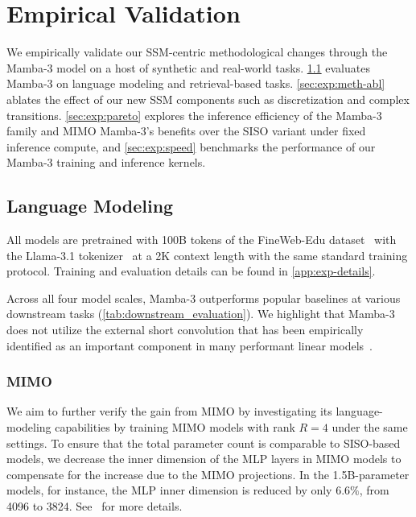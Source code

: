 


\section{Empirical Validation}
\label{sec:empirical_validation}
We empirically validate our SSM-centric methodological changes through the Mamba-3 model on a host of synthetic and real-world tasks.
\cref{sec:exp:lm} evaluates Mamba-3 on language modeling and retrieval-based tasks.
\cref{sec:exp:meth-abl} ablates the effect of our new SSM components such as discretization and complex transitions.
\cref{sec:exp:pareto} explores the inference efficiency of the Mamba-3 family and MIMO Mamba-3's benefits over the SISO variant under fixed inference compute, and \cref{sec:exp:speed} benchmarks the performance of our Mamba-3 training and inference kernels.

\subsection{Language Modeling}
\label{sec:exp:lm}

All models are pretrained with 100B tokens of the FineWeb-Edu dataset~\citep{penedo2024finewebdatasetsdecantingweb} with the Llama-3.1 tokenizer~\citep{grattafiori2024llama3herdmodels} at a 2K context length with the same standard training protocol. Training and evaluation details can be found in \cref{app:exp-details}.

Across all four model scales, Mamba-3 outperforms popular baselines at various downstream tasks (\cref{tab:downstream_evaluation}).
We highlight that Mamba-3 does not utilize the
external short convolution that has been empirically identified as an important component in many performant linear models~\citep{gu2024mambalineartimesequencemodeling,yang2025gateddeltanetworksimproving,allen2025canon}.

\subsubsection{MIMO}
We aim to further verify the gain from MIMO by investigating its language-modeling capabilities by training MIMO models with rank $R=4$ under the same settings.
To ensure that the total parameter count is comparable to SISO-based models, we decrease the inner dimension of the MLP layers in MIMO models to compensate for the increase due to the MIMO projections.
In the 1.5B-parameter models, for instance, the MLP inner dimension is reduced by only $6.6\%$, from 4096 to 3824. See~ for more details.

